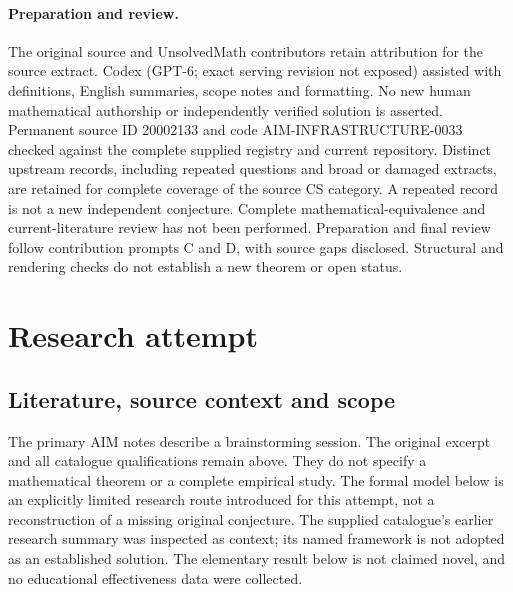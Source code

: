 \documentclass[11pt]{article}
\begin{document}
\paragraph{Preparation and review.}
The original source and UnsolvedMath contributors retain attribution for the source extract. Codex (GPT-6; exact serving revision not exposed) assisted with definitions, English summaries, scope notes and formatting. No new human mathematical authorship or independently verified solution is asserted. Permanent source ID 20002133 and code AIM-INFRASTRUCTURE-0033 checked against the complete supplied registry and current repository. Distinct upstream records, including repeated questions and broad or damaged extracts, are retained for complete coverage of the source CS category. A repeated record is not a new independent conjecture. Complete mathematical-equivalence and current-literature review has not been performed. Preparation and final review follow contribution prompts C and D, with source gaps disclosed. Structural and rendering checks do not establish a new theorem or open status.
\label{end:20002133}

\section{Research attempt}
\subsection{Literature, source context and scope}
The primary AIM notes describe a brainstorming session. The original excerpt and all catalogue qualifications remain above. They do not specify a mathematical theorem or a complete empirical study. The formal model below is an explicitly limited research route introduced for this attempt, not a reconstruction of a missing original conjecture. The supplied catalogue's earlier research summary was inspected as context; its named framework is not adopted as an established solution. The elementary result below is not claimed novel, and no educational effectiveness data were collected.
\end{document}
